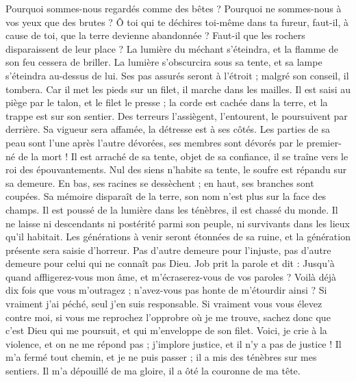 \begin{multicols}{2}
Pourquoi sommes-nous regardés comme des bêtes ? Pourquoi ne sommes-nous à vos yeux que des brutes ?
Ô toi qui te déchires toi-même dans ta fureur, faut-il, à cause de toi, que la terre devienne abandonnée ? Faut-il que les rochers disparaissent de leur place ?
La lumière du méchant s'éteindra, et la flamme de son feu cessera de briller.
La lumière s'obscurcira sous sa tente, et sa lampe s'éteindra au-dessus de lui.
Ses pas assurés seront à l'étroit ; malgré son conseil, il tombera.
Car il met les pieds sur un filet, il marche dans les mailles.
Il est saisi au piège par le talon, et le filet le presse ;
la corde est cachée dans la terre, et la trappe est sur son sentier.
Des terreurs l'assiègent, l'entourent, le poursuivent par derrière.
Sa vigueur sera affamée, la détresse est à ses côtés.
Les parties de sa peau sont l'une après l'autre dévorées, ses membres sont dévorés par le premier-né de la mort !
Il est arraché de sa tente, objet de sa confiance, il se traîne vers le roi des épouvantements.
Nul des siens n'habite sa tente, le soufre est répandu sur sa demeure.
En bas, ses racines se dessèchent ; en haut, ses branches sont coupées.
Sa mémoire disparaît de la terre, son nom n'est plus sur la face des champs.
Il est poussé de la lumière dans les ténèbres, il est chassé du monde.
Il ne laisse ni descendants ni postérité parmi son peuple, ni survivants dans les lieux qu'il habitait.
Les générations à venir seront étonnées de sa ruine, et la génération présente sera saisie d'horreur.
Pas d'autre demeure pour l'injuste, pas d'autre demeure pour celui qui ne connaît pas Dieu.
\VerseOne{}Job prit la parole et dit :
Jusqu'à quand affligerez-vous mon âme, et m'écraserez-vous de vos paroles ?
Voilà déjà dix fois que vous m'outragez ; n'avez-vous pas honte de m'étourdir ainsi ?
Si vraiment j'ai péché, seul j'en suis responsable.
Si vraiment vous vous élevez contre moi, si vous me reprochez l'opprobre où je me trouve,
sachez donc que c'est Dieu qui me poursuit, et qui m'enveloppe de son filet.
Voici, je crie à la violence, et on ne me répond pas ; j'implore justice, et il n'y a pas de justice !
Il m'a fermé tout chemin, et je ne puis passer ; il a mis des ténèbres sur mes sentiers.
Il m'a dépouillé de ma gloire, il a ôté la couronne de ma tête.

\end{multicols}
